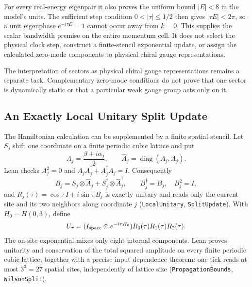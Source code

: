 For every real-energy eigenpair it also proves the uniform bound $|E|<8$ in the model's units. The sufficient step condition $0<|\tau|\leq1/2$ then gives $|\tau E|<2\pi$, so a unit eigenphase $e^{-i\tau E}=1$ cannot occur away from $k=0$. This supplies the scalar bandwidth premise on the entire momentum cell. It does not select the physical clock step, construct a finite-stencil exponential update, or assign the calculated zero-mode components to physical chiral gauge representations.

The interpretation of sectors as physical chiral gauge representations remains a separate task. Complementary zero-mode conditions do not prove that one sector is dynamically static or that a particular weak gauge group acts only on it.

\subsection{An Exactly Local Unitary Split Update}
The Hamiltonian calculation can be supplemented by a finite spatial stencil. Let $S_j$ shift one coordinate on a finite periodic cubic lattice and put
\begin{equation}
 A_j=\frac{\beta+i\alpha_j}{2},\qquad
 \widehat A_j=\operatorname{diag}(A_j,A_j).
\end{equation}
Lean checks $A_j^2=0$ and $A_jA_j^\dagger+A_j^\dagger A_j=I$. Consequently
\begin{equation}
 B_j=S_j\otimes\widehat A_j+S_j^\dagger\otimes\widehat A_j^\dagger,
 \qquad B_j^\dagger=B_j,\quad B_j^2=I,
\end{equation}
and $R_j(\tau)=\cos\tau\,I+i\sin\tau\,B_j$ is exactly unitary and reads only the current site and its two neighbors along coordinate $j$ (\nolinkurl{LocalUnitary}, \nolinkurl{SplitUpdate}). With $H_0=H(0,3)$, define
\begin{equation}
 U_\tau=(I_{\rm space}\otimes e^{-i\tau H_0})R_0(\tau)R_1(\tau)R_2(\tau).
\end{equation}
The on-site exponential mixes only eight internal components. Lean proves unitarity and conservation of the total squared amplitude on every finite periodic cubic lattice, together with a precise input-dependence theorem: one tick reads at most $3^3=27$ spatial sites, independently of lattice size (\nolinkurl{PropagationBounds}, \nolinkurl{WilsonSplit}).


